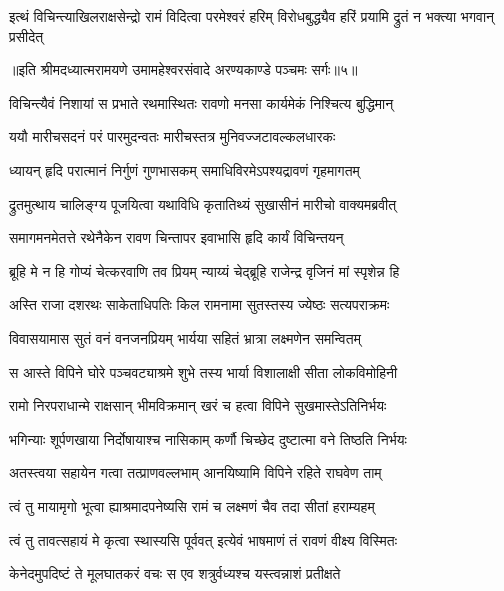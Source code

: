 \fourlineindentedshloka
{इत्थं विचिन्त्याखिलराक्षसेन्द्रो}
{रामं विदित्वा परमेश्वरं हरिम्}
{विरोधबुद्ध्यैव हरिं प्रयामि}
{द्रुतं न भक्त्या भगवान् प्रसीदेत्} %

{॥इति श्रीमदध्यात्मरामयणे उमामहेश्वरसंवादे
अरण्यकाण्डे पञ्चमः सर्गः॥५॥
}




\twolineshloka
{विचिन्त्यैवं निशायां स प्रभाते रथमास्थितः}
{रावणो मनसा कार्यमेकं निश्चित्य बुद्धिमान्} %

\twolineshloka
{ययौ मारीचसदनं परं पारमुदन्वतः}
{मारीचस्तत्र मुनिवज्जटावल्कलधारकः} %

\twolineshloka
{ध्यायन् हृदि परात्मानं निर्गुणं गुणभासकम्}
{समाधिविरमेऽपश्यद्रावणं गृहमागतम्} %

\twolineshloka
{द्रुतमुत्थाय चालिङ्ग्य पूजयित्वा यथाविधि}
{कृतातिथ्यं सुखासीनं मारीचो वाक्यमब्रवीत्} %

\twolineshloka
{समागमनमेतत्ते रथेनैकेन रावण}
{चिन्तापर इवाभासि हृदि कार्यं विचिन्तयन्} %

\twolineshloka
{ब्रूहि मे न हि गोप्यं चेत्करवाणि तव प्रियम्}
{न्याय्यं चेद्ब्रूहि राजेन्द्र वृजिनं मां स्पृशेन्न हि} %


\twolineshloka
{अस्ति राजा दशरथः साकेताधिपतिः किल}
{रामनामा सुतस्तस्य ज्येष्ठः सत्यपराक्रमः} %

\twolineshloka
{विवासयामास सुतं वनं वनजनप्रियम्}
{भार्यया सहितं भ्रात्रा लक्ष्मणेन समन्वितम्} %

\twolineshloka
{स आस्ते विपिने घोरे पञ्चवट्याश्रमे शुभे}
{तस्य भार्या विशालाक्षी सीता लोकविमोहिनी} %

\twolineshloka
{रामो निरपराधान्मे राक्षसान् भीमविक्रमान्}
{खरं च हत्वा विपिने सुखमास्तेऽतिनिर्भयः} %

\twolineshloka
{भगिन्याः शूर्पणखाया निर्दोषायाश्च नासिकाम्}
{कर्णौ चिच्छेद दुष्टात्मा वने तिष्ठति निर्भयः} %

\twolineshloka
{अतस्त्वया सहायेन गत्वा तत्प्राणवल्लभाम्}
{आनयिष्यामि विपिने रहिते राघवेण ताम्} %

\twolineshloka
{त्वं तु मायामृगो भूत्वा ह्याश्रमादपनेष्यसि}
{रामं च लक्ष्मणं चैव तदा सीतां हराम्यहम्} %

\twolineshloka
{त्वं तु तावत्सहायं मे कृत्वा स्थास्यसि पूर्ववत्}
{इत्येवं भाषमाणं तं रावणं वीक्ष्य विस्मितः} %

\twolineshloka
{केनेदमुपदिष्टं ते मूलघातकरं वचः}
{स एव शत्रुर्वध्यश्च यस्त्वन्नाशं प्रतीक्षते} %

